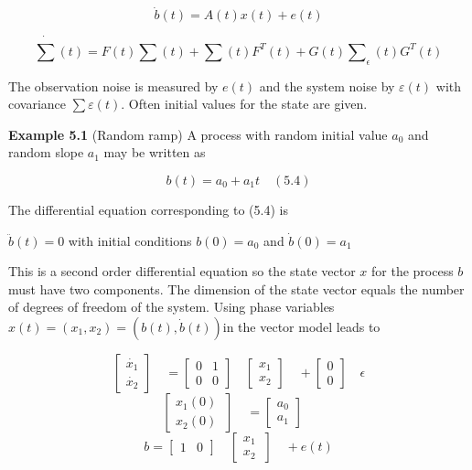 	  \begin{equation}\label{5.2}
	  \dot{b}(t)=A(t)x(t)+e(t)
	  \end{equation}
	  
	  \begin{equation}\label{5.3}
	  \dot{\sum}(t)=F(t)\sum(t)+\sum(t)F^{T}(t)+G(t)\sum\nolimits_{\epsilon}(t)G^{T}(t)
	  \end{equation}
	  
	  
	   
	  
	   The observation noise is measured by $ e(t) $ and the system noise by $ \varepsilon(t) $ with covariance $ \sum \varepsilon (t) $. Often initial values for the state are given.
	   
	   \textbf{Example 5.1} (Random ramp) A process with random initial value $ a_{0} $  and random slope $ a_{1} $ may be written as 
	   
	   \begin{equation}\label{5.4}
	    b(t)=a_{0}+a_{1}t \quad(5.4)
	   \end{equation}
	  
	   
	     The differential equation corresponding to (5.4) is
	     
	    $\ddot{b}(t)=0  $ with initial conditions $ b(0)=a_{0} $  and $ \dot{b}(0)=a_{1} $ 
	    
	    This is a second order differential equation so the state vector $ x $ for the process $ b $ must have two components. The dimension of the state vector equals the number of degrees of freedom of the system. Using phase variables $ x(t)=(x_{1},x_{2})=(b(t),\dot{b}(t)) $in the vector model leads to
	    
	    \[ \begin{bmatrix} \dot{x_{1}}  \\ \dot{x_{2}} \end{bmatrix} \quad=\begin{bmatrix} 0 & 1 \\ 0 &  0 \end{bmatrix} \quad\begin{bmatrix} x_{1}  \\ x_{2}  \end{bmatrix} \quad+\begin{bmatrix} 0 \\ 0 \end{bmatrix} \quad\epsilon\] 
	    \[ \begin{bmatrix} x_{1}(0)\\ x_{2}(0)\ \end{bmatrix} \quad=\begin{bmatrix} a_{0} \\ a_{1}\end{bmatrix} \quad \]
	    \[ b= \begin{bmatrix} 1 & 0\end{bmatrix} \quad\begin{bmatrix} x_{1}\\ x_{2}\ \end{bmatrix} \quad+e(t)\]
	    
